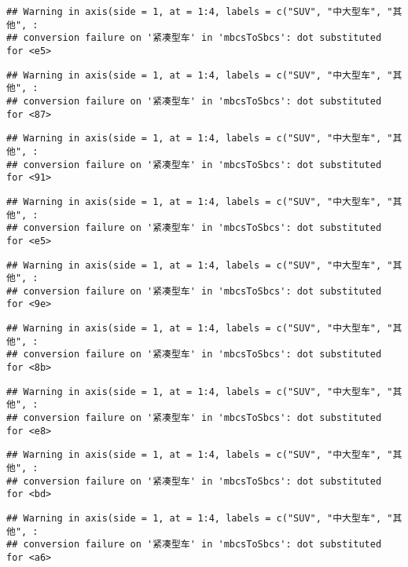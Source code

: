 \documentclass[]{article}
\begin{document}
\begin{verbatim}
## Warning in axis(side = 1, at = 1:4, labels = c("SUV", "中大型车", "其他", :
## conversion failure on '紧凑型车' in 'mbcsToSbcs': dot substituted for <e5>
\end{verbatim}

\begin{verbatim}
## Warning in axis(side = 1, at = 1:4, labels = c("SUV", "中大型车", "其他", :
## conversion failure on '紧凑型车' in 'mbcsToSbcs': dot substituted for <87>
\end{verbatim}

\begin{verbatim}
## Warning in axis(side = 1, at = 1:4, labels = c("SUV", "中大型车", "其他", :
## conversion failure on '紧凑型车' in 'mbcsToSbcs': dot substituted for <91>
\end{verbatim}

\begin{verbatim}
## Warning in axis(side = 1, at = 1:4, labels = c("SUV", "中大型车", "其他", :
## conversion failure on '紧凑型车' in 'mbcsToSbcs': dot substituted for <e5>
\end{verbatim}

\begin{verbatim}
## Warning in axis(side = 1, at = 1:4, labels = c("SUV", "中大型车", "其他", :
## conversion failure on '紧凑型车' in 'mbcsToSbcs': dot substituted for <9e>
\end{verbatim}

\begin{verbatim}
## Warning in axis(side = 1, at = 1:4, labels = c("SUV", "中大型车", "其他", :
## conversion failure on '紧凑型车' in 'mbcsToSbcs': dot substituted for <8b>
\end{verbatim}

\begin{verbatim}
## Warning in axis(side = 1, at = 1:4, labels = c("SUV", "中大型车", "其他", :
## conversion failure on '紧凑型车' in 'mbcsToSbcs': dot substituted for <e8>
\end{verbatim}

\begin{verbatim}
## Warning in axis(side = 1, at = 1:4, labels = c("SUV", "中大型车", "其他", :
## conversion failure on '紧凑型车' in 'mbcsToSbcs': dot substituted for <bd>
\end{verbatim}

\begin{verbatim}
## Warning in axis(side = 1, at = 1:4, labels = c("SUV", "中大型车", "其他", :
## conversion failure on '紧凑型车' in 'mbcsToSbcs': dot substituted for <a6>
\end{verbatim}
\end{document}

